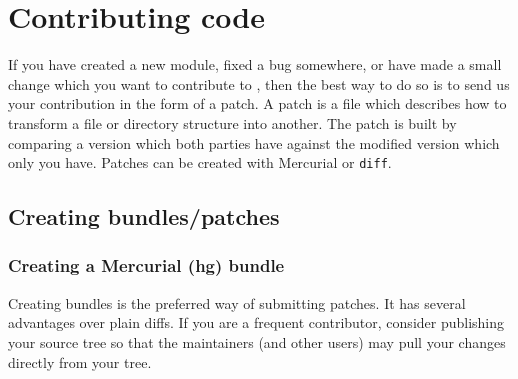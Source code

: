 
\chapter{Contributing code}

If you have created a new module, fixed a bug somewhere, or have made
a small change which you want to contribute to \package{}, then the
best way to do so is to send us your contribution in the form of a
patch. A patch is a file which describes how to transform a file or
directory structure into another. The patch is built by comparing a
version which both parties have against the modified version which
only you have. Patches can be created with Mercurial
or \texttt{diff}.

\section{Creating bundles/patches}
\subsection{Creating a Mercurial (hg) bundle}

Creating bundles is the preferred way of submitting patches. It has
several advantages over plain diffs. If you are a frequent
contributor, consider publishing your source tree so that the \ffc{}
maintainers (and other users) may pull your changes directly from your
tree.

